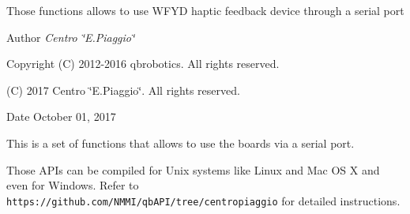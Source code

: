 Those functions allows to use W\+F\+YD haptic feedback device through a serial port\begin{DoxyAuthor}{Author}
{\itshape Centro \char`\"{}\+E.\+Piaggio\char`\"{}} 
\end{DoxyAuthor}
\begin{DoxyCopyright}{Copyright}
(C) 2012-\/2016 qbrobotics. All rights reserved. 

(C) 2017 Centro \char`\"{}\+E.\+Piaggio\char`\"{}. All rights reserved.
\end{DoxyCopyright}
\begin{DoxyDate}{Date}
October 01, 2017
\end{DoxyDate}
This is a set of functions that allows to use the boards via a serial port.

Those A\+P\+Is can be compiled for Unix systems like Linux and Mac OS X and even for Windows. Refer to {\tt https\+://github.\+com/\+N\+M\+M\+I/qb\+A\+P\+I/tree/centropiaggio} for detailed instructions. 